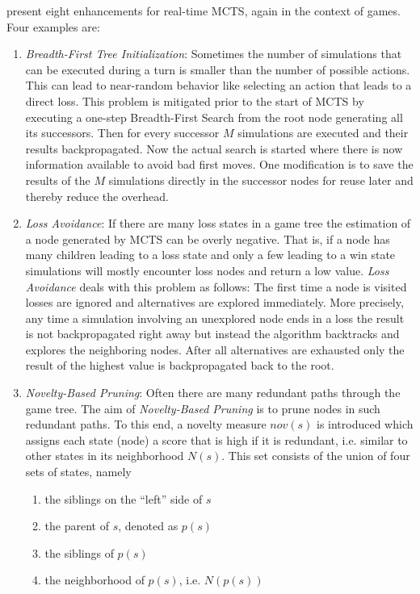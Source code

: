 \cite{soemers2016enhancements} present eight enhancements for real-time MCTS, again in the context of games. Four examples are:
\begin{enumerate}[label=\alph*)]
    \item \textit{Breadth-First Tree Initialization}: Sometimes the number of simulations that can be executed during a turn is smaller than the number of possible actions. This can lead to near-random behavior like selecting an action that leads to a direct loss. This problem is mitigated prior to the start of MCTS by executing a one-step Breadth-First Search from the root node generating all its successors. Then for every successor $M$ simulations are executed and their results backpropagated. Now the actual search is started where there is now information available to avoid bad first moves. One modification is to save the results of the $M$ simulations directly in the successor nodes for reuse later and thereby reduce the overhead.
    \item \textit{Loss Avoidance}: If there are many loss states in a game tree the estimation of a node generated by MCTS can be overly negative. That is, if a node has many children leading to a loss state and only a few leading to a win state simulations will mostly encounter loss nodes and return a low value. \textit{Loss Avoidance} deals with this problem as follows: The first time a node is visited losses are ignored and alternatives are explored immediately. More precisely, any time a simulation involving an unexplored node ends in a loss the result is not backpropagated right away but instead the algorithm backtracks and explores the neighboring nodes. After all alternatives are exhausted only the result of the highest value is backpropagated back to the root.
    \item \textit{Novelty-Based Pruning}: Often there are many redundant paths through the game tree. The aim of \textit{Novelty-Based Pruning} is to prune nodes in such redundant paths. To this end, a novelty measure $nov(s)$ is introduced which assigns each state (node) a score that is high if it is redundant, i.e. similar to other states in its neighborhood $N(s)$. This set consists of the union of four sets of states, namely \begin{enumerate}[label=\roman*)]
        \item the siblings on the \enquote{left} side of $s$
        \item the parent of $s$, denoted as $p(s)$
        \item the siblings of $p(s)$
        \item the neighborhood of $p(s)$, i.e. $N(p(s))$
    \end{enumerate}
    

\end{enumerate}

